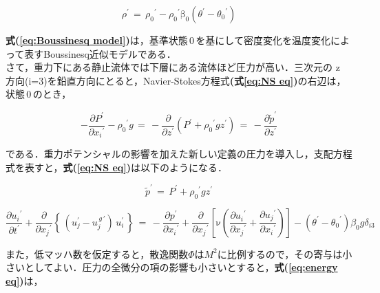 \begin{equation}
\rho^{\prime}
\,{=}\,
{\rho_{0}}^{\prime} - {\rho_{0}}^{\prime} {\mathrm{\beta}}_{0} \left({ \theta^{\prime} - {\theta_{0}}^{\prime} }\right)
\label{eq:Boussinesq model}
\end{equation}

\noindent \textbf{式(\ref{eq:Boussinesq model})}は，基準状態$\,0\,$を基にして密度変化を温度変化によって表すBoussinesq近似モデルである．\\

さて，重力下にある静止流体では下層にある流体ほど圧力が高い．三次元の z 方向(i=3)を鉛直方向にとると，Navier-Stokes方程式\textbf{(式\ref{eq:NS eq})}の右辺は，状態$\,0\,$のとき，

\begin{equation}
{-}\frac{\partial P^{\prime}}{\partial{{x}_{i}}^{\prime}} - {\rho_{0}}^{\prime}{g}
\, =\, 
{-}\frac{\partial}{\partial{z}^{\prime}} \left({ P^{\prime} + {\rho_{0}}^{\prime} g {z}^{\prime} }\right) 
\,{=}\,
{-}\frac{\partial{\tilde{p}}^{\prime}}{\partial{z}^{\prime}}
\end{equation}

\noindent である．重力ポテンシャルの影響を加えた新しい定義の圧力を導入し，支配方程式を表すと，\textbf{式(\ref{eq:NS eq})}は以下のようになる．

\begin{equation}
{\tilde{p}}^{\prime} \,{=}\, {P}^{\prime} {+} {\rho_{0}}^{\prime} g {z}^{\prime}
\end{equation}

\begin{equation}
\frac{\partial{{u}_{i}}^{\prime}} {\partial{t}^{\prime}} + \frac{\partial}{\partial{{x}_{j}}^{\prime}} \left \{ \,\left( u_j^\prime - u_j^{\,g\,\prime} \right) \, u_i^\prime \, \right \}
\,{=}\,
- \frac{\partial{p}^{\prime}}{\partial{{x}_{i}}^{\prime}} + \frac{\partial}{\partial{{x}_{j}}^{\prime}} \left[{ \mathrm{\nu}\left({\frac{\partial{{u}_{i}}^{\prime}}{\partial{{x}_{j}}^{\prime}} + \frac{\partial{{u}_{j}}^{\prime}}{\partial{{x}_{i}}^{\prime}} }\right) }\right] - \left({ \theta^{\prime} - {\theta_{0}}^{\prime} }\right) \beta_{0} g \delta_{i3}
\label{eq:NS eq2}
\end{equation}

\vspace{5mm}
\noindent また，低マッハ数を仮定すると，散逸関数$\Phi$は$M^2$に比例するので，その寄与は小さいとしてよい．圧力の全微分の項の影響も小さいとすると，\textbf{式(\ref{eq:energy eq})}は，


